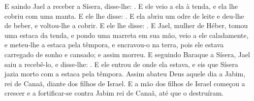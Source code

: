 {  E saindo Jael a receber a Sísera, disse-lhe: . E ele veio a ela à tenda, e ela lhe cobriu com uma manta.
  E ele lhe disse: . E ela abriu um odre de leite e deu-lhe de beber, e voltou-lhe a cobrir.
  E ele lhe disse: .
  E Jael, mulher de Héber, tomou uma estaca da tenda, e pondo uma marreta em sua mão, veio a ele caladamente, e meteu-lhe a estaca pela têmpora, e encravou-o na terra, pois ele estava carregado de sonho e cansado; e assim morreu.
  E seguindo Baraque a Sísera, Jael saiu a recebê-lo, e disse-lhe: . E ele entrou de onde ela estava, e eis que Sísera jazia morto com a estaca pela têmpora.
  Assim abateu Deus aquele dia a Jabim, rei de Canaã, diante dos filhos de Israel.
  E a mão dos filhos de Israel começou a crescer e a fortificar-se contra Jabim rei de Canaã, até que o destruíram.
\par }

